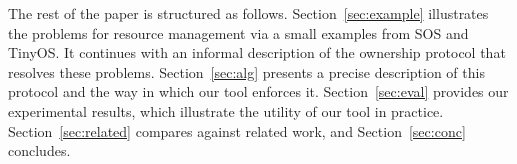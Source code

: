 The rest of the paper is structured as follows.
Section~\ref{sec:example} illustrates the problems for resource
management via a small examples from SOS and TinyOS.  It continues
with an informal description of the ownership protocol that resolves
these problems.  Section~\ref{sec:alg} presents a precise description
of this protocol and the way in which our tool enforces it.
Section~\ref{sec:eval} provides our experimental results, which
illustrate the utility of our tool in practice.
Section~\ref{sec:related} compares against related work, and
Section~\ref{sec:conc} concludes.

